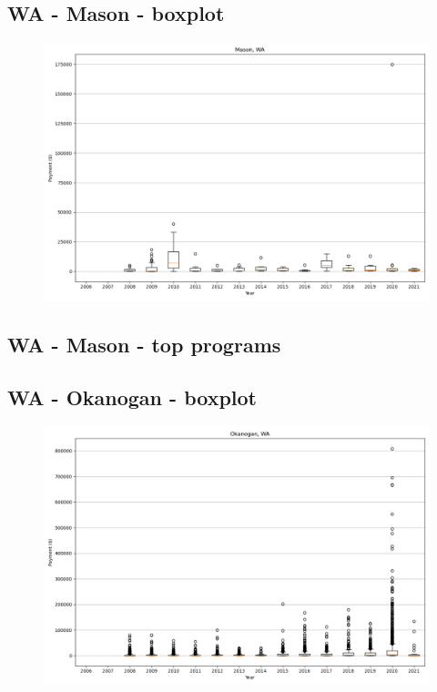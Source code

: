 \subsection*{WA - Mason - boxplot}
\begin{figure}[h]
\centering
\includegraphics[width=7in]{../output/boxplots/counties/Mason-WA_boxplot.png}
\end{figure}


\subsection*{WA - Mason - top programs}

\newpage
\subsection*{WA - Okanogan - boxplot}
\begin{figure}[h]
\centering
\includegraphics[width=7in]{../output/boxplots/counties/Okanogan-WA_boxplot.png}
\end{figure}


